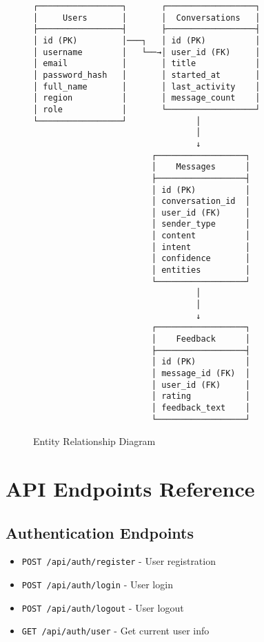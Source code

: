 \documentclass[12pt,a4paper]{article}
\begin{document}
\begin{figure}[h]
\centering
\begin{verbatim}
┌─────────────────┐       ┌──────────────────┐
│     Users       │       │  Conversations   │
├─────────────────┤       ├──────────────────┤
│ id (PK)         │───┐   │ id (PK)          │
│ username        │   └──→│ user_id (FK)     │
│ email           │       │ title            │
│ password_hash   │       │ started_at       │
│ full_name       │       │ last_activity    │
│ region          │       │ message_count    │
│ role            │       └──────────────────┘
└─────────────────┘              │
                                 │
                                 ↓
                        ┌──────────────────┐
                        │    Messages      │
                        ├──────────────────┤
                        │ id (PK)          │
                        │ conversation_id  │
                        │ user_id (FK)     │
                        │ sender_type      │
                        │ content          │
                        │ intent           │
                        │ confidence       │
                        │ entities         │
                        └──────────────────┘
                                 │
                                 │
                                 ↓
                        ┌──────────────────┐
                        │    Feedback      │
                        ├──────────────────┤
                        │ id (PK)          │
                        │ message_id (FK)  │
                        │ user_id (FK)     │
                        │ rating           │
                        │ feedback_text    │
                        └──────────────────┘
\end{verbatim}
\caption{Entity Relationship Diagram}
\label{fig:erd}
\end{figure}

\section{API Endpoints Reference}

\subsection{Authentication Endpoints}

\begin{itemize}[leftmargin=*]
    \item \texttt{POST /api/auth/register} - User registration
    \item \texttt{POST /api/auth/login} - User login
    \item \texttt{POST /api/auth/logout} - User logout
    \item \texttt{GET /api/auth/user} - Get current user info
\end{itemize}
\end{document}

